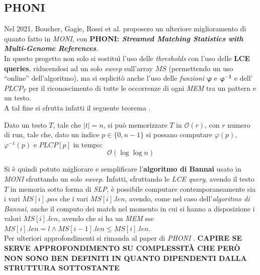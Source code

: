\subsection{PHONI}
Nel 2021, Boucher, Gagie, Rossi et al. proposero un ulteriore miglioramento di
quanto fatto in \textit{MONI}, con \textbf{PHONI: \textit{Streamed Matching
    Statistics with Multi-Genome References}}.\\
In questo progetto non solo si sostituì l'uso delle \textit{thresholds} con
l'uso delle \textbf{LCE queries}, riducendosi ad un solo \textit{sweep}
sull'array $MS$ (permettendo un uso ``online'' dell'algoritmo), ma si
esplicitò anche l'uso delle \textit{funzioni} $\mathbf{\varphi}$ e
$\mathbf{\varphi^{-1}}$ e dell'$PLCP_T$ per il riconoscimento di tutte le
occorrenze di ogni \textit{MEM} tra un pattern e un testo.\\
A tal fine si sfrutta infatti il seguente teorema \cite{gagie2020}.
\begin{teorema}
  Dato un testo $T$, tale che $|t|=n$, si può memorizzare $T$ in
  $\mathcal{O}(r)$, con $r$ numero di run, tale che, dato un indice
  $p\in\{0,n-1\}$ si possano computare $\varphi(p)$, $\varphi^{-1}(p)$ e
  $PLCP[p]$ in tempo:
  \[\mathcal{O}(\log\log n)\]
\end{teorema}
Si è quindi potuto migliorare e semplificare l'\textbf{algoritmo di Bannai}
usato in \textit{MONI} sfruttando un solo \textit{sweep}. Infatti, sfruttando le
\textit{LCE query}, avendo il testo $T$ in memoria sotto forma di \textit{SLP},
è possibile computare contemporaneamente sia i vari
$MS[i].pos$ che i vari $MS[i].len$, avendo, come nel caso dell'\textit{algoritmo
  di Bannai}, anche il computo dei match nel momento in cui si hanno a
disposizione i valori $MS[i].len$, avendo che si ha un \textit{MEM} sse
$MS[i].len=l\land MS[i-1].len\leq MS[i].len$.\\ 
Per ulteriori approfondimenti si rimanda al paper di \textit{PHONI}
\cite{phoni}.
\textbf{CAPIRE SE SERVE APPROFONDIMENTO SU COMPLESSITÀ CHE PERÒ NON SONO BEN
  DEFINITI IN QUANTO DIPENDENTI DALLA STRUTTURA SOTTOSTANTE}